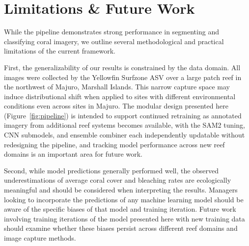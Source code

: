 \documentclass[11pt]{elsarticle}
\begin{document}
\section{Limitations \& Future Work}
\label{sec:limitations}

While the pipeline demonstrates strong performance in segmenting and classifying coral imagery, we outline several methodological and practical limitations of the current framework.

First, the generalizability of our results is constrained by the data domain. All images were collected by the Yellowfin Surfzone ASV over a large patch reef in the northwest of Majuro, Marshall Islands. This narrow capture space may induce distributional shift when applied to sites with different environmental conditions even across sites in Majuro. The modular design presented here (Figure~\ref{fig:pipeline}) is intended to support continued retraining as annotated imagery from additional reef systems becomes available, with the SAM2 tuning, CNN submodels, and ensemble combiner each independently updatable without redesigning the pipeline, and tracking model performance across new reef domains is an important area for future work.

Second, while model predictions generally performed well, the observed underestimations of average coral cover and bleaching rates are ecologically meaningful and should be considered when interpreting the results. Managers looking to incorporate the predictions of any machine learning model should be aware of the specific biases of that model and training iteration. Future work involving training iterations of the model presented here with new training data should examine whether these biases persist across different reef domains and image capture methods.
\end{document}
